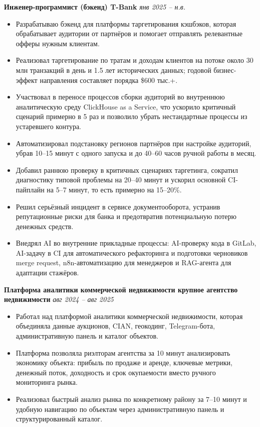 \documentclass[10pt,a4paper]{article}
\begin{document}
\textbf{Инженер-программист (бэкенд) \textbar{} T-Bank} \hfill \textit{янв 2025 -- н.в.}
\begin{itemize}
  \item Разрабатываю бэкенд для платформы таргетирования кэшбэков, которая обрабатывает аудитории от партнёров и помогает отправлять релевантные офферы нужным клиентам.
  \item Реализовал таргетирование по тратам и доходам клиентов на потоке около 30 млн транзакций в день и 1.5 лет исторических данных; годовой бизнес-эффект направления составляет порядка \$600 тыс.+.
  \item Участвовал в переносе процессов сборки аудиторий во внутреннюю аналитическую среду ClickHouse as a Service, что ускорило критичный сценарий примерно в 5 раз и позволило убрать нестандартные процессы из устаревшего контура.
  \item Автоматизировал подстановку регионов партнёров при настройке аудиторий, убрав 10--15 минут с одного запуска и до 40--60 часов ручной работы в месяц.
  \item Добавил раннюю проверку в критичных сценариях таргетинга, сократил диагностику типовой проблемы на 20--40 минут и ускорил основной CI-пайплайн на 5--7 минут, то есть примерно на 15--20\%.
  \item Решил серьёзный инцидент в сервисе документооборота, устранив репутационные риски для банка и предотвратив потенциальную потерю денежных средств.
  \item Внедрял AI во внутренние прикладные процессы: AI-проверку кода в GitLab, AI-задачу в CI для автоматического рефакторинга и подготовки черновиков merge request, n8n-автоматизацию для менеджеров и RAG-агента для адаптации стажёров.
\end{itemize}

\textbf{Платформа аналитики коммерческой недвижимости \textbar{} крупное агентство недвижимости} \hfill \textit{авг 2024 -- авг 2025}
\begin{itemize}
  \item Работал над платформой аналитики коммерческой недвижимости, которая объединяла данные аукционов, CIAN, геокодинг, Telegram-бота, административную панель и каталог объектов.
  \item Платформа позволяла риэлторам агентства за 10 минут анализировать экономику объекта: прибыль по продаже и аренде, ключевые метрики, денежный поток, доходность и срок окупаемости вместо ручного мониторинга рынка.
  \item Реализовал быстрый анализ рынка по конкретному району за 7--10 минут и удобную навигацию по объектам через административную панель и структурированный каталог.
\end{itemize}
\end{document}
